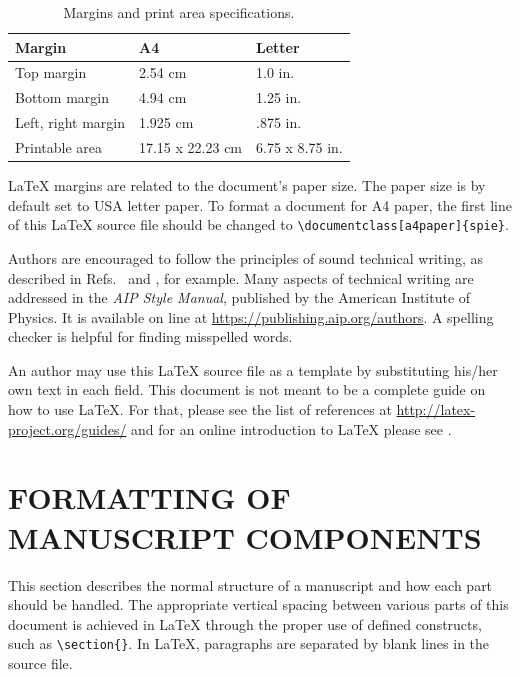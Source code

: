 \documentclass[]{spie}  %
\begin{document}
\begin{table}[ht]
\caption{Margins and print area specifications.} 
\label{tab:Paper Margins}
\begin{center}       
\begin{tabular}{|l|l|l|} 
\hline
\rule[-1ex]{0pt}{3.5ex}  Margin & A4 & Letter  \\
\hline
\rule[-1ex]{0pt}{3.5ex}  Top margin & 2.54 cm & 1.0 in.   \\
\hline
\rule[-1ex]{0pt}{3.5ex}  Bottom margin & 4.94 cm & 1.25 in.  \\
\hline
\rule[-1ex]{0pt}{3.5ex}  Left, right margin & 1.925 cm & .875 in.  \\
\hline
\rule[-1ex]{0pt}{3.5ex}  Printable area & 17.15 x 22.23 cm & 6.75 x 8.75 in.  \\
\hline 
\end{tabular}
\end{center}
\end{table}

LaTeX margins are related to the document's paper size. The paper size is by default set to USA letter paper. To format a document for A4 paper, the first line of this LaTeX source file should be changed to \verb|\documentclass[a4paper]{spie}|.   

Authors are encouraged to follow the principles of sound technical writing, as described in Refs.~ and , for example.  Many aspects of technical writing are addressed in the {\em AIP Style Manual}, published by the American Institute of Physics.  It is available on line at \url{https://publishing.aip.org/authors}. A spelling checker is helpful for finding misspelled words. 

An author may use this LaTeX source file as a template by substituting his/her own text in each field.  This document is not meant to be a complete guide on how to use LaTeX.  For that, please see the list of references at \url{http://latex-project.org/guides/} and for an online introduction to LaTeX please see . 

\section{FORMATTING OF MANUSCRIPT COMPONENTS}

This section describes the normal structure of a manuscript and how each part should be handled.  The appropriate vertical spacing between various parts of this document is achieved in LaTeX through the proper use of defined constructs, such as \verb|\section{}|.  In LaTeX, paragraphs are separated by blank lines in the source file. 
\end{document}
